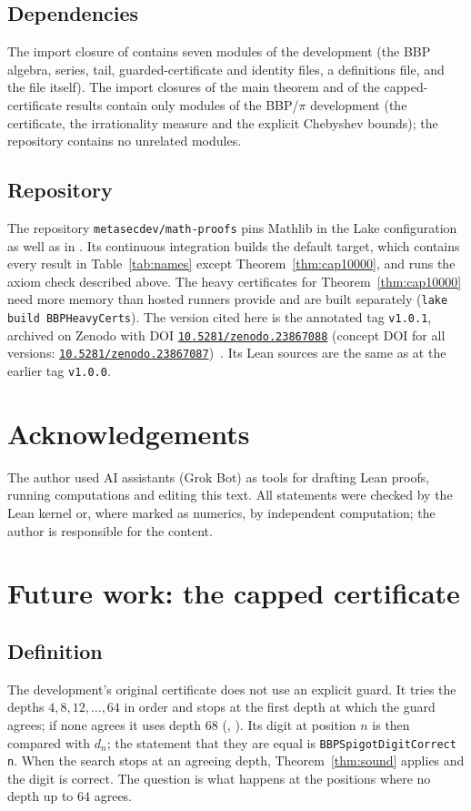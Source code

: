 \documentclass[11pt]{amsart}
\theoremstyle{definition}
\theoremstyle{remark}
\begin{document}
\subsection*{Dependencies}
The import closure of  contains seven modules of
the development (the BBP algebra, series, tail, guarded-certificate and
identity files, a definitions file, and the file itself). The import closures
of the main theorem and of the capped-certificate results contain only
modules of the BBP/$\pi$ development (the certificate, the irrationality
measure and the explicit Chebyshev bounds); the repository contains no
unrelated modules.

\subsection*{Repository}
The repository \texttt{metasecdev/math-proofs} pins Mathlib in the Lake
configuration as well as in . Its continuous
integration builds the default target, which contains every result in
Table~\ref{tab:names} except Theorem~\ref{thm:cap10000}, and runs the axiom
check described above. The heavy certificates for Theorem~\ref{thm:cap10000}
need more memory than hosted runners provide and are built separately
(\texttt{lake build BBPHeavyCerts}). The version cited here is the
annotated tag \texttt{v1.0.1}, archived on Zenodo with DOI
\href{https://doi.org/10.5281/zenodo.23867088}{\texttt{10.5281/zenodo.23867088}}
(concept DOI for all versions:
\href{https://doi.org/10.5281/zenodo.23867087}{\texttt{10.5281/zenodo.23867087}})~\cite{MathProofsSoftware}.
Its Lean sources are the same as at the earlier tag \texttt{v1.0.0}.

\section*{Acknowledgements}
The author used AI assistants (Grok Bot) as tools for drafting Lean proofs,
running computations and editing this text. All statements were checked by
the Lean kernel or, where marked as numerics, by independent computation;
the author is responsible for the content.

\appendix

\section{Future work: the capped certificate}\label{app:future}

\subsection{Definition}
The development's original certificate does not use an explicit guard. It
tries the depths $4,8,12,\dots,64$ in order and stops at the first depth at
which the guard agrees; if none agrees it uses depth $68$
(, ). Its digit at position $n$ is
then compared with $d_n$; the statement that they are equal is
\mbox{\texttt{BBPSpigotDigitCorrect n}}. When the search stops at an agreeing depth,
Theorem~\ref{thm:sound} applies and the digit is correct. The question is
what happens at the positions where no depth up to $64$ agrees.
\end{document}
